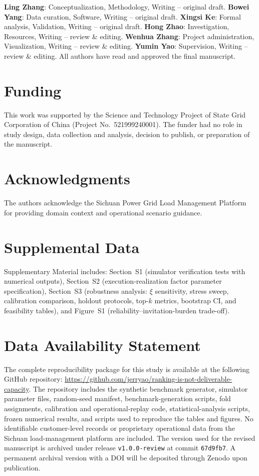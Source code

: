 \documentclass[utf8]{FrontiersinHarvard}
\begin{document}
\textbf{Ling Zhang}: Conceptualization, Methodology, Writing -- original draft.
\textbf{Bowei Yang}: Data curation, Software, Writing -- original draft.
\textbf{Xingsi Ke}: Formal analysis, Validation, Writing -- original draft.
\textbf{Hong Zhao}: Investigation, Resources, Writing -- review \& editing.
\textbf{Wenhua Zhang}: Project administration, Visualization, Writing -- review \& editing.
\textbf{Yumin Yao}: Supervision, Writing -- review \& editing.
All authors have read and approved the final manuscript.

\section*{Funding}

This work was supported by the Science and Technology Project of
State Grid Corporation of China (Project No.\ 521999240001).
The funder had no role in study design, data collection and
analysis, decision to publish, or preparation of the manuscript.

\section*{Acknowledgments}

The authors acknowledge the Sichuan Power Grid Load Management
Platform for providing domain context and operational scenario
guidance.

\section*{Supplemental Data}

Supplementary Material includes:
Section~S1 (simulator verification tests with numerical outputs),
Section~S2 (execution-realization factor parameter specification),
Section~S3 (robustness analysis: $\xi$ sensitivity, stress sweep,
calibration comparison, holdout protocols, top-$k$ metrics,
bootstrap CI, and feasibility tables),
and Figure~S1 (reliability--invitation-burden trade-off).

\section*{Data Availability Statement}

The complete reproducibility package for this study is available
at the following GitHub repository:
\url{https://github.com/jerryao/ranking-is-not-deliverable-capacity}.
The repository includes the synthetic benchmark generator,
simulator parameter files, random-seed manifest,
benchmark-generation scripts, fold assignments, calibration and
operational-replay code, statistical-analysis scripts, frozen
numerical results, and scripts used to reproduce the tables and
figures. No identifiable customer-level records or proprietary
operational data from the Sichuan load-management platform are
included. The version used for the revised manuscript is archived
under release \texttt{v1.0.0-review} at commit \texttt{67d9fb7}.
A permanent archival version with a DOI will be deposited through
Zenodo upon publication.




\end{document}
